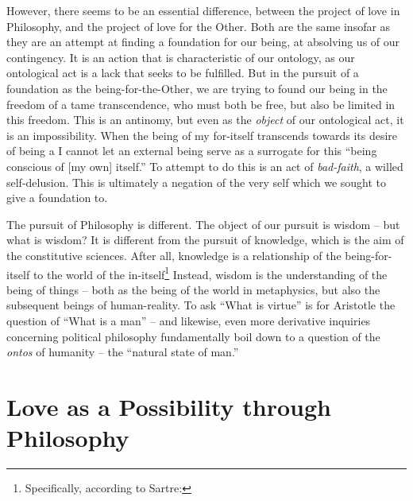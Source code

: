 However, there seems to be an essential difference, between the project of love in Philosophy, and the project of love for the Other. Both are the same insofar as they are an attempt at finding a foundation for our being, at absolving us of our contingency. It is an action that is characteristic of our ontology, as our ontological act is a lack that seeks to be fulfilled. But in the pursuit of a foundation as the being-for-the-Other, we are trying to found our being in the freedom of a tame transcendence, who must both be free, but also be limited in this freedom. This is an antinomy, but even as the \emph{object} of our ontological act, it is an impossibility. When the being of my for-itself transcends towards its desire of being a  I cannot let an external being serve as a surrogate for this \enquote{being conscious of [my own] itself.} 
To attempt to do this is an act of \emph{bad-faith}, a willed self-delusion. This is ultimately a negation of the very self which we sought to give a foundation to.  

The pursuit of Philosophy is different. The object of our pursuit is wisdom -- but what is wisdom? It is different from the pursuit of knowledge, which is the aim of the constitutive sciences. After all, knowledge is a relationship of the being-for-itself to the world of the in-itself\footnote{Specifically,  according to Sartre: } Instead, wisdom is the understanding of the being of things -- both as the being of the world in metaphysics, but also the subsequent beings of human-reality. To ask \enquote{What is virtue} is for Aristotle the question of \enquote{What is a man} -- and likewise, even more derivative inquiries concerning political philosophy fundamentally boil down to a question of the \emph{ontos} of humanity -- the \enquote{natural state of man.}


\section{Love as a Possibility through Philosophy}